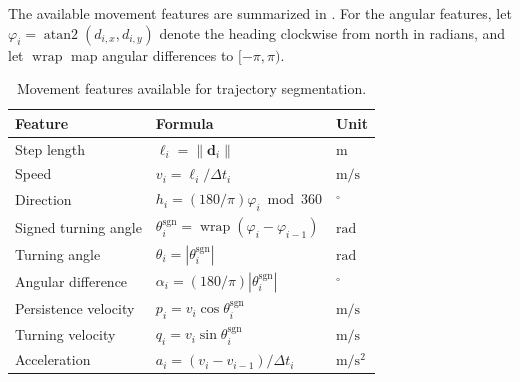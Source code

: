The available movement features are summarized in .
For the angular features, let $\varphi_i=\operatorname{atan2}(d_{i,x},d_{i,y})$ denote the heading clockwise from north in radians, 
and let $\operatorname{wrap}$ map angular differences to $[-\pi,\pi)$.
\begin{table}[htbp]
    \centering
    \caption{Movement features available for trajectory segmentation.}
    \label{tab:segmentation-features}
    \begin{tabularx}{\textwidth}{@{}lXl@{}}
        \toprule
        Feature & Formula & Unit \\
        \midrule
        Step length
            & $\ell_i=\lVert\mathbf d_i\rVert$
            & $\mathrm{m}$ \\[0.4em]
        Speed
            & $v_i=\ell_i/\Delta t_i$
            & $\mathrm{m}/\mathrm{s}$ \\[0.4em]
        Direction
            & $h_i=(180/\pi)\varphi_i\bmod 360$
            & $ {}^\circ $ \\[0.4em]
        Signed turning angle
            & $\theta_i^{\mathrm{sgn}}=\operatorname{wrap}(\varphi_i-\varphi_{i-1})$
            & $\mathrm{rad}$ \\[0.4em]
        Turning angle
            & $\theta_i=|\theta_i^{\mathrm{sgn}}|$
            & $\mathrm{rad}$ \\[0.4em]
        Angular difference
            & $\alpha_i=(180/\pi)|\theta_i^{\mathrm{sgn}}|$
            & $ {}^\circ $ \\[0.4em]
        Persistence velocity
            & $p_i=v_i\cos\theta_i^{\mathrm{sgn}}$
            & $\mathrm{m}/\mathrm{s}$ \\[0.4em]
        Turning velocity
            & $q_i=v_i\sin\theta_i^{\mathrm{sgn}}$
            & $\mathrm{m}/\mathrm{s}$ \\[0.4em]
        Acceleration
            & $a_i=(v_i-v_{i-1})/\Delta t_i$
            & $\mathrm{m}/\mathrm{s}^2$ \\
        \bottomrule
    \end{tabularx}
\end{table}

